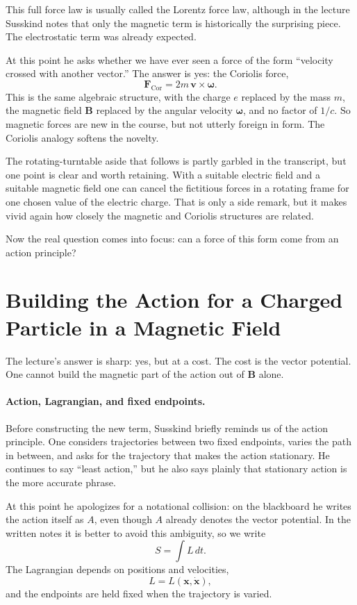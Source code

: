 This full force law is usually called the Lorentz force law, although in the lecture Susskind notes that only the magnetic term is historically the surprising piece. The electrostatic term was already expected.

At this point he asks whether we have ever seen a force of the form ``velocity crossed with another vector.'' The answer is yes: the Coriolis force,
\begin{equation}
\mathbf F_{\mathrm{Cor}}=2m\,\mathbf v\times \boldsymbol\omega.
\end{equation}
This is the same algebraic structure, with the charge \(e\) replaced by the mass \(m\), the magnetic field \(\mathbf B\) replaced by the angular velocity \(\boldsymbol\omega\), and no factor of \(1/c\). So magnetic forces are new in the course, but not utterly foreign in form. The Coriolis analogy softens the novelty.

The rotating-turntable aside that follows is partly garbled in the transcript, but one point is clear and worth retaining. With a suitable electric field and a suitable magnetic field one can cancel the fictitious forces in a rotating frame for one chosen value of the electric charge. That is only a side remark, but it makes vivid again how closely the magnetic and Coriolis structures are related.

Now the real question comes into focus: can a force of this form come from an action principle?

\section{Building the Action for a Charged Particle in a Magnetic Field}

The lecture's answer is sharp: yes, but at a cost. The cost is the vector potential. One cannot build the magnetic part of the action out of \(\mathbf B\) alone.

\paragraph{Action, Lagrangian, and fixed endpoints.}
Before constructing the new term, Susskind briefly reminds us of the action principle. One considers trajectories between two fixed endpoints, varies the path in between, and asks for the trajectory that makes the action stationary. He continues to say ``least action,'' but he also says plainly that stationary action is the more accurate phrase.

At this point he apologizes for a notational collision: on the blackboard he writes the action itself as \(A\), even though \(A\) already denotes the vector potential. In the written notes it is better to avoid this ambiguity, so we write
\begin{equation}
S=\int L\,dt.
\end{equation}
The Lagrangian depends on positions and velocities,
\begin{equation}
L=L(\mathbf x,\dot{\mathbf x}),
\end{equation}
and the endpoints are held fixed when the trajectory is varied.

